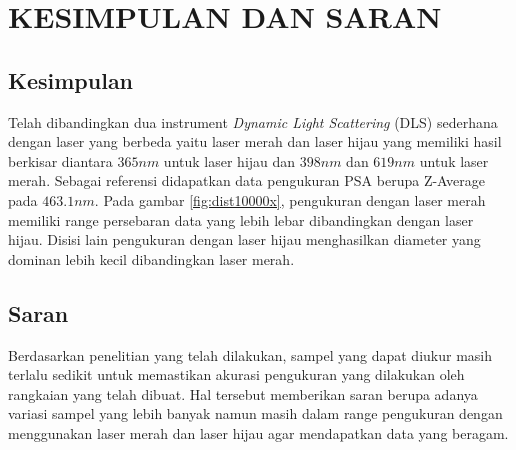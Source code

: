 \chapter{KESIMPULAN DAN SARAN}

\section{Kesimpulan}
Telah dibandingkan dua instrument \textit{Dynamic Light Scattering} (DLS) sederhana dengan
laser yang berbeda yaitu laser merah dan laser hijau yang memiliki hasil berkisar diantara
${365 nm}$ untuk laser hijau dan ${398 nm}$ dan ${619 nm}$ untuk laser merah.
Sebagai referensi didapatkan data pengukuran PSA berupa Z-Average pada ${463.1 nm}$.
Pada gambar \ref{fig:dist10000x}, pengukuran dengan laser merah memiliki range persebaran 
data yang lebih lebar dibandingkan dengan laser hijau. Disisi lain pengukuran dengan laser
hijau menghasilkan diameter yang dominan lebih kecil dibandingkan laser merah.



\section{Saran}
Berdasarkan penelitian yang telah dilakukan, sampel yang dapat diukur masih terlalu
sedikit untuk memastikan akurasi pengukuran yang dilakukan oleh rangkaian yang telah
dibuat. Hal tersebut memberikan saran berupa adanya variasi sampel yang lebih banyak
namun masih dalam range pengukuran dengan menggunakan laser merah dan laser hijau
agar mendapatkan data yang beragam.